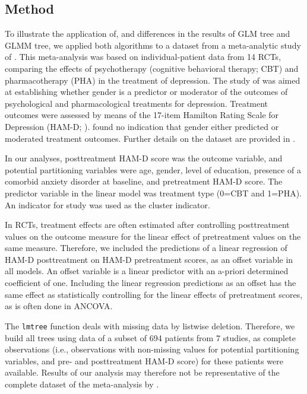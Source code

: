\documentclass[nobf,doc]{apa}
\begin{document}
\subsection{Method}
To illustrate the application of, and differences in the results of GLM tree and GLMM tree, we applied both algorithms to a dataset from a meta-analytic study of . This meta-analysis was based on individual-patient data from 14 RCTs, comparing the effects of psychotherapy (cognitive behavioral therapy; CBT) and pharmacotherapy (PHA) in the treatment of depression. The study of  was aimed at establishing whether gender is a predictor or moderator of the outcomes of psychological and pharmacological treatments for depression. Treatment outcomes were assessed by means of the 17-item Hamilton Rating Scale for Depression (HAM-D; ).  found no indication that gender either predicted or moderated treatment outcomes. Further details on the dataset are provided in .

In our analyses, posttreatment HAM-D score was the outcome variable, and potential partitioning variables were age, gender, level of education, presence of a comorbid anxiety disorder at baseline, and pretreatment HAM-D score. The predictor variable in the linear model was treatment type (0=CBT and 1=PHA). An indicator for study was used as the cluster indicator. 

In RCTs, treatment effects are often estimated after controlling posttreatment values on the outcome measure for the linear effect of pretreatment values on the same measure. Therefore, we included the predictions of a linear regression of HAM-D posttreatment on HAM-D pretreatment scores, as an offset variable in all models. An offset variable is a linear predictor with an a-priori determined coefficient of one. Including the linear regression predictions as an offset has the same effect as statistically controlling for the linear effects of pretreatment scores, as is often done in ANCOVA. 

The \verb|lmtree| function deals with missing data by listwise deletion. Therefore, we build all trees using data of a subset of 694 patients from 7 studies, as complete observations (i.e., observations with non-missing values for potential partitioning variables, and pre- and posttreatment HAM-D score) for these patients were available. Results of our analysis may therefore not be representative of the complete dataset of the meta-analysis by \cite{CuijyWeit14}. 
\end{document}
